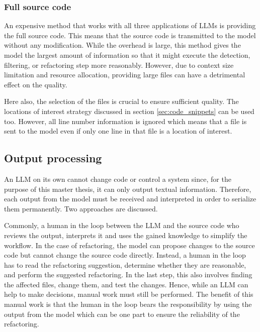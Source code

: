 \subsubsection{Full source code}

An expensive method that works with all three applications of \acp{LLM} is providing the full source code. This means that the source code is transmitted to the model without any modification. While the overhead is large, this method gives the model the largest amount of information so that it might execute the detection, filtering, or refactoring step more reasonably. However, due to context size limitation and resource allocation, providing large files can have a detrimental  effect on the quality. 

Here also, the selection of the files is crucial to ensure sufficient quality. The locations of interest strategy discussed in section \ref{sec:code_snippets} can be used too. However, all line number information is ignored which means that a file is sent to the model even if only one line in that file is a location of interest. 




\subsection{Output processing}\label{sec:output_processing}
An \ac{LLM} on its own cannot change code or control a system since, for the purpose of this master thesis, it  can only output textual information. Therefore, each output from the model must be received and interpreted  in order to serialize them permanently. Two approaches are discussed. 

Commonly, a human in the loop between the \ac{LLM} and the source code who reviews the output, interprets it and uses the gained knowledge to simplify the workflow. In the case of refactoring, the model can propose changes to the source code but cannot change the source code directly. Instead, a human in the loop has to read the refactoring suggestion, determine whether they are reasonable, and perform the suggested refactoring. In the last step, this also involves finding the affected files, change them, and test the changes. Hence, while an \ac{LLM} can help to make decisions, manual work must still be performed. The benefit of this manual work is that the human in the loop bears the responsibility by using the output from the model which can be one part to ensure the reliability of the refactoring. 

